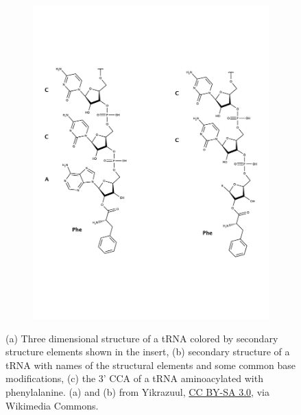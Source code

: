 \begin{figure}
\begin{subfigure}[b]{0.3\textwidth}
         \caption{}
         \label{fig:tRNA_2d_struct}
     \end{subfigure}
     \hfill
     \begin{subfigure}[b]{0.2\textwidth}
         \centering
         \includegraphics[width=\textwidth]{figures/chap4/CCA_Phe.pdf}
         \caption{}
         \label{fig:tRNA_CCAester}
     \end{subfigure}
        \caption[tRNA structure]{
        (a) Three dimensional structure of a tRNA colored by secondary structure elements shown in the insert, (b) secondary structure of a tRNA with names of the structural elements and some common base modifications, (c) the 3' CCA of a tRNA aminoacylated with phenylalanine.
        (a) and (b) from Yikrazuul, \href{https://creativecommons.org/licenses/by-sa/3.0}{CC BY-SA 3.0}, via Wikimedia Commons.
        }
\end{figure}





